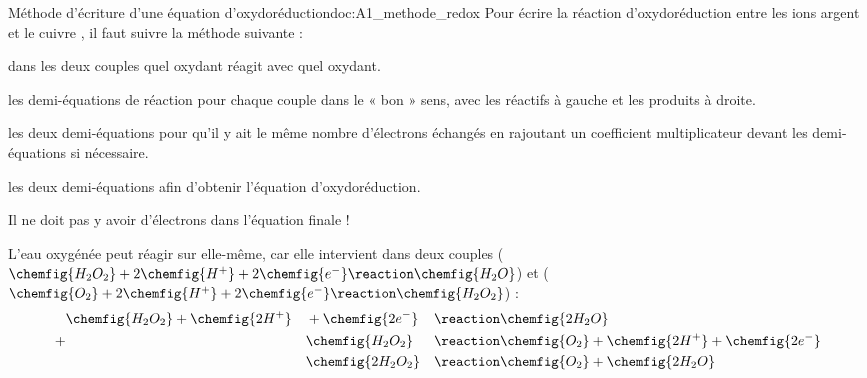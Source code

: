 

\begin{doc}{Méthode d'écriture d'une équation d'oxydoréduction}{doc:A1_methode_redox}
  Pour écrire la réaction d'oxydoréduction entre les ions argent  et le cuivre , il faut suivre la méthode suivante :
  \begin{enumeration}
    \item {} dans les deux couples quel oxydant réagit avec quel oxydant.
    \item {} les demi-équations de réaction pour chaque couple dans le « bon » sens, avec les réactifs à gauche et les produits à droite.
    \item {} les deux demi-équations pour qu'il y ait le même nombre d'électrons échangés en rajoutant un coefficient multiplicateur devant les demi-équations si nécessaire. 
    \item {} les deux demi-équations afin d'obtenir l'équation d'oxydoréduction.
  \end{enumeration}
  \attention Il ne doit pas y avoir d'électrons dans l'équation finale !

  \exemple L'eau oxygénée peut réagir sur elle-même, car elle intervient dans deux couples 
  ($\chemfig{H_2O_2} + 2\chemfig{H^+} + 2\chemfig{e^{-}} \reaction \chemfig{H_2O}$) et
  ($\chemfig{O_2} + 2\chemfig{H^+} + 2\chemfig{e^{-}} \reaction \chemfig{H_2O_2}$) : 
  \begin{alignat*}{3}
     & \chemfig{H_2O_2} + \chemfig{2H^{+}} &&+ \chemfig{2e^{-}} &&\reaction \chemfig{2H_2O} \\
    +& &&\chemfig{H_2O_2}  &&\reaction \chemfig{O_2} + \chemfig{2H^{+}} + \chemfig{2e^{-}} \\
     & &&\chemfig{2H_2O_2} &&\reaction \chemfig{O_2} + \chemfig{2H_2O}
  \end{alignat*}
\end{doc}

